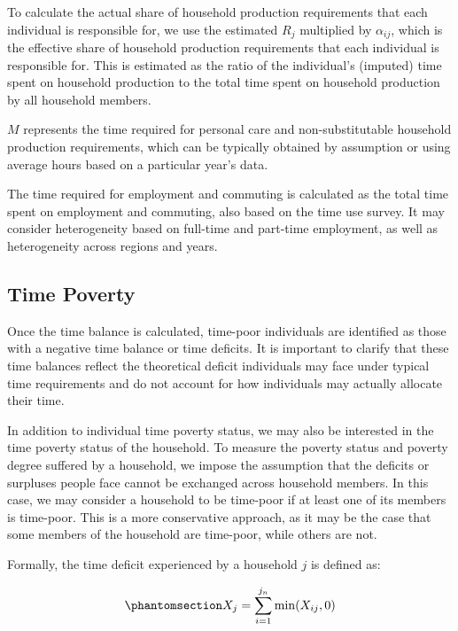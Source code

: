 \documentclass[
  11pt,
]{article}
\begin{document}
To calculate the actual share of household production requirements that
each individual is responsible for, we use the estimated \(R_j\)
multiplied by \(\alpha_{ij}\), which is the effective share of household
production requirements that each individual is responsible for. This is
estimated as the ratio of the individual's (imputed) time spent on
household production to the total time spent on household production by
all household members.

\(M\) represents the time required for personal care and
non-substitutable household production requirements, which can be
typically obtained by assumption or using average hours based on a
particular year's data.

The time required for employment and commuting is calculated as the
total time spent on employment and commuting, also based on the time use
survey. It may consider heterogeneity based on full-time and part-time
employment, as well as heterogeneity across regions and years.

\subsection{Time Poverty}\label{time-poverty}

Once the time balance is calculated, time-poor individuals are
identified as those with a negative time balance or time deficits. It is
important to clarify that these time balances reflect the theoretical
deficit individuals may face under typical time requirements and do not
account for how individuals may actually allocate their time.

In addition to individual time poverty status, we may also be interested
in the time poverty status of the household. To measure the poverty
status and poverty degree suffered by a household, we impose the
assumption that the deficits or surpluses people face cannot be
exchanged across household members. In this case, we may consider a
household to be time-poor if at least one of its members is time-poor.
This is a more conservative approach, as it may be the case that some
members of the household are time-poor, while others are not.

Formally, the time deficit experienced by a household \(j\) is defined
as:

\begin{equation}\phantomsection\label{eq-hhdef}{X_j = \sum_{i=1}^{j_n} \min(X_{ij},0)}\end{equation}
\end{document}
